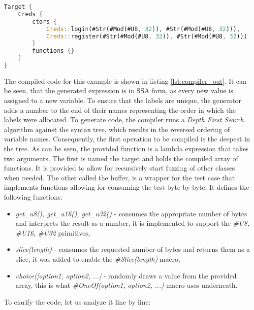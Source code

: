 \begin{minipage}{\linewidth}
\begin{lstlisting}[language=rust,caption={Creds class description.},label={lst:cred_dsc}]
Target {
    Creds {
        ctors {
            Creds::login(#Str(#Mod(#U8, 32)), #Str(#Mod(#U8, 32))),
            Creds::register(#Str(#Mod(#U8, 32)), #Str(#Mod(#U8, 32)))
        }
        functions {}
    }
}
\end{lstlisting} 
\end{minipage}

The compiled code for this example is shown in listing \ref{lst:compiler_out}. It can be seen, that the generated expression is in SSA form, as every new value is assigned to a new variable. To ensure that the labels are unique, the generator adds a number to the end of their names representing the order in which the labels were allocated. To generate code, the compiler runs a \textit{Depth First Search} algorithm against the syntax tree, which results in the reversed ordering of variable names. Consequently, the first operation to be compiled is the deepest in the tree. As can be seen, the provided function is a lambda expression that takes two arguments. The first is named the target and holds the compiled array of functions. It is provided to allow for recursively start fuzzing of other classes when needed. The other called the buffer, is a wrapper for the test case that implements functions allowing for consuming the test byte by byte. It defines the following functions:
\begin{itemize}
    \item \textit{get\_u8(), get\_u16(), get\_u32()} - consumes the appropriate number of bytes and interprets the result as a number, it is implemented to support the \textit{\#U8, \#U16, \#U32} primitives,
    \item \textit{slice(length)} - consumes the requested number of bytes and returns them as a slice, it was added to enable the \textit{\#Slice(length)} macro,
    \item \textit{choice([option1, option2, ...]} - randomly draws a value from the provided array, this is what \textit{\#OneOf(option1, option2, ...)} macro uses underneath.
\end{itemize}
To clarify the code, let us analyze it line by line:
